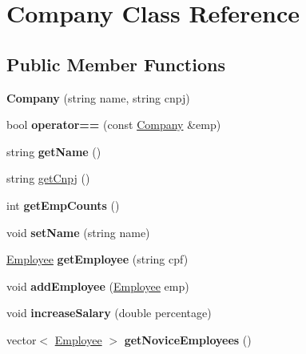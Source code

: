 \hypertarget{classCompany}{}\section{Company Class Reference}
\label{classCompany}
\subsection*{Public Member Functions}
\begin{DoxyCompactItemize}
\item 
{\bfseries Company} (string name, string cnpj)\hypertarget{classCompany_a72db72d1957066e60f96e2c264f80dfc}{}\label{classCompany_a72db72d1957066e60f96e2c264f80dfc}

\item 
bool {\bfseries operator==} (const \hyperlink{classCompany}{Company} \&emp)\hypertarget{classCompany_a766c644633386e0fe01d9b3135d87a1a}{}\label{classCompany_a766c644633386e0fe01d9b3135d87a1a}

\item 
string {\bfseries get\+Name} ()\hypertarget{classCompany_a57eeaf550401b1c01b2a509b25ec8aab}{}\label{classCompany_a57eeaf550401b1c01b2a509b25ec8aab}

\item 
string \hyperlink{classCompany_a0154fd462d026b97b5bc982cd63d1d89}{get\+Cnpj} ()
\item 
int {\bfseries get\+Emp\+Counts} ()\hypertarget{classCompany_aa36694cdeef1af7a8010192479712429}{}\label{classCompany_aa36694cdeef1af7a8010192479712429}

\item 
void {\bfseries set\+Name} (string name)\hypertarget{classCompany_acf0f570169d151442f1b2ad00560aadd}{}\label{classCompany_acf0f570169d151442f1b2ad00560aadd}

\item 
\hyperlink{classEmployee}{Employee} {\bfseries get\+Employee} (string cpf)\hypertarget{classCompany_a0034f0ebd418813b31da569f9e2c5084}{}\label{classCompany_a0034f0ebd418813b31da569f9e2c5084}

\item 
void {\bfseries add\+Employee} (\hyperlink{classEmployee}{Employee} emp)\hypertarget{classCompany_a47bb24c0e10656eecdc74f6e03238e7e}{}\label{classCompany_a47bb24c0e10656eecdc74f6e03238e7e}

\item 
void {\bfseries increase\+Salary} (double percentage)\hypertarget{classCompany_a9c8755181c09349e94386fd7b18ce0ee}{}\label{classCompany_a9c8755181c09349e94386fd7b18ce0ee}

\item 
vector$<$ \hyperlink{classEmployee}{Employee} $>$ {\bfseries get\+Novice\+Employees} ()\hypertarget{classCompany_a0a5483bc2850869b41745b002f98b22f}{}\label{classCompany_a0a5483bc2850869b41745b002f98b22f}

\end{DoxyCompactItemize}
